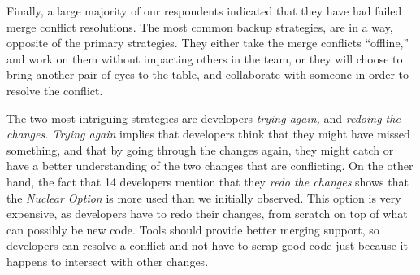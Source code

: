 Finally, a large majority of our respondents indicated that they have had failed merge conflict resolutions.
The most common backup strategies, are in a way, opposite of the primary strategies.
They either take the merge conflicts ``offline,'' and work on them without impacting others in the team, or they will choose to bring another pair of eyes to the table, and collaborate with someone in order to resolve the conflict.

The two most intriguing strategies are developers \emph{trying again,} and \emph{redoing the changes.}
\emph{Trying again} implies that developers think that they might have missed something, and that by going through the changes again, they might catch or have a better understanding of the two changes that are conflicting.
On the other hand, the fact that 14 developers mention that they \emph{redo the changes} shows that the \emph{Nuclear Option} is more used than we initially observed.
This option is very expensive, as developers have to redo their changes, from scratch on top of what can possibly be new code.
Tools should provide better merging support, so developers can resolve a conflict and not have to scrap good code just because it happens to intersect with other changes.

